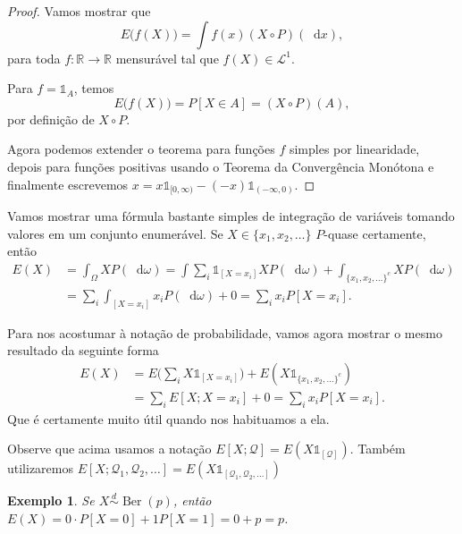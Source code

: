 \documentclass[reqno, draft]{book}
\newcommand*\1{\mathds{1}}
\newtheorem{example}{Exemplo}[section]
\DeclareMathOperator{\Ber}{Ber}
\renewcommand*\d{\mathop{}\!\mathrm{d}}
\begin{document}
\begin{proof}
  Vamos mostrar que
  \begin{equation}
    E\big(f(X)\big) = \int f(x) (X \circ P) (\d x),
  \end{equation}
  para toda $f: \mathbb{R} \to \mathbb{R}$ mensurável tal que $f(X) \in \mathcal{L}^1$.

  Para $f = \1_A$, temos
  \begin{equation}
    E\big(f(X)\big) = P[X \in A] = (X \circ P) (A),
  \end{equation}
  por definição de $X \circ P$.

  Agora podemos extender o teorema para funções $f$ simples por linearidade, depois para funções positivas usando o Teorema da Convergência Monótona e finalmente escrevemos $x = x \1_{[0, \infty)} - (-x) \1_{(-\infty,0)}$.
\end{proof}

Vamos mostrar uma fórmula bastante simples de integração de variáveis tomando valores em um conjunto enumerável.
Se $X \in \{x_1, x_2, \dots\}$ $P$-quase certamente, então
\begin{equation}
  \begin{split}
    E(X) & = \int_\Omega X P(\d \omega) = \int \sum_i \1_{[X = x_i]} X P(\d \omega) + \int_{\{x_1, x_2, \dots\}^c} X P(\d \omega)\\
    & = \sum_i \int_{[X = x_i]} x_i P(\d \omega) + 0 = \sum_i x_i P[X = x_i].
  \end{split}
\end{equation}

Para nos acostumar à notação de probabilidade, vamos agora mostrar o mesmo resultado da seguinte forma
\begin{equation}
  \begin{split}
    E(X) & = E\Big(\sum_i X \1_{[X = x_i]}\Big) + E(X \1_{\{x_1, x_2, \dots\}^c})\\
    & = \sum_i E[X; X = x_i] + 0 = \sum_i x_i P[X = x_i].
  \end{split}
\end{equation}
Que é certamente muito útil quando nos habituamos a ela.

Observe que acima usamos a notação $E[X; \mathcal{Q}] = E(X \1_{[\mathcal{Q}]})$.
Também utilizaremos $E[X; \mathcal{Q}_1, \mathcal{Q}_2, \dots] = E(X \1_{[\mathcal{Q}_1, \mathcal{Q}_2, \dots]})$

\begin{example}
  Se $X \overset{d}\sim \Ber(p)$, então $E(X) = 0 \cdot P[X = 0] + 1 P[X = 1] = 0 + p = p$.
\end{example}
\end{document}
